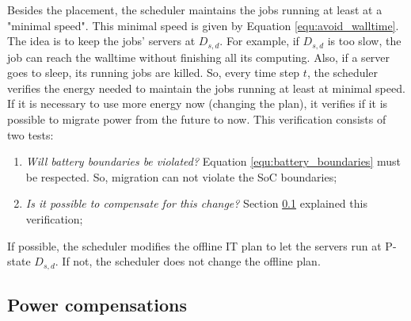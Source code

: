 Besides the placement, the scheduler maintains the jobs running at least at a "minimal speed". This minimal speed is given by Equation \ref{equ:avoid_walltime}. The idea is to keep the jobs' servers at $D_{s,d}$. For example, if $D_{s,d}$ is too slow, the job can reach the walltime without finishing all its computing. Also, if a server goes to sleep, its running jobs are killed. So, every time step $t$, the scheduler verifies the energy needed to maintain the jobs running at least at minimal speed. If it is necessary to use more energy now (changing the plan), it verifies if it is possible to migrate power from the future to now. This verification consists of two tests:
\begin{enumerate}
    \item \textit{Will battery boundaries be violated?} Equation \ref{equ:battery_boundaries} must be respected. So, migration can not violate the SoC boundaries;
    \item \textit{Is it possible to compensate for this change?} Section \ref{sec:power_compensation} explained this verification;
\end{enumerate}

If possible, the scheduler modifies the offline IT plan to let the servers run at P-state $D_{s,d}$. If not, the scheduler does not change the offline plan.

\subsection{Power compensations}
\label{sec:power_compensation}

